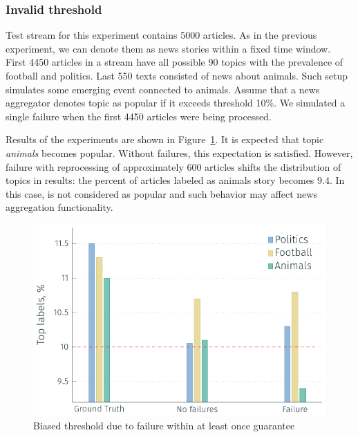 \subsubsection{Invalid threshold}


Test stream for this experiment contains 5000 articles. As in the previous experiment, we can denote them as news stories within a fixed time window. First 4450 articles in a stream have all possible 90 topics with the prevalence of football and politics. Last 550 texts consisted of news about animals. Such setup simulates some emerging event connected to animals. Assume that a news aggregator denotes topic as popular if it exceeds threshold 10\%. We simulated a single failure when the first 4450 articles were being processed.

Results of the experiments are shown in Figure~\ref{biased_threshold}. It is expected that topic {\em animals} becomes popular. Without failures, this expectation is satisfied. However, failure with reprocessing of approximately 600 articles shifts the distribution of topics in results: the percent of articles labeled as animals story becomes 9.4. In this case, is not considered as popular and such behavior may affect news aggregation functionality.

\begin{figure}[htbp]
  \centering
  \includegraphics[scale=0.68]{pics/biased_threshold}
  \caption{Biased threshold due to failure within at least once guarantee}
  \label {biased_threshold}
\end{figure}

